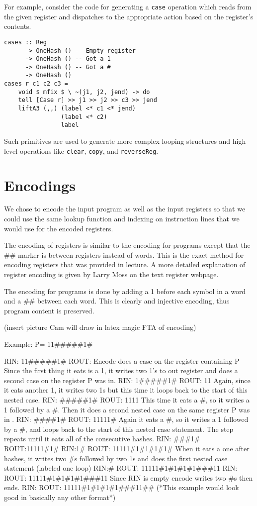 \documentclass[10pt, preprint, nocopyrightspace]{sigplanconf}
\begin{document}
For example, consider the code for generating a \texttt{case} operation which
reads from the given register and dispatches to the appropriate action based
on the register's contents.
\begin{lstlisting}
cases :: Reg
      -> OneHash () -- Empty register
      -> OneHash () -- Got a 1
      -> OneHash () -- Got a #
      -> OneHash ()
cases r c1 c2 c3 =
    void $ mfix $ \ ~(j1, j2, jend) -> do
    tell [Case r] >> j1 >> j2 >> c3 >> jend
    liftA3 (,,) (label <* c1 <* jend)
                (label <* c2)
                label
\end{lstlisting}
Such primitives are used to generate more complex looping structures and high level
operations like \texttt{clear}, \texttt{copy}, and \texttt{reverseReg}.

\section{Encodings}

We chose to encode the input program as well as the input registers so that we could use the same lookup function and indexing on instruction lines that we would use for the encoded registers. 

The encoding of registers is similar to the encoding for programs except that the \#\# marker is between registers instead of words. This is the exact method for encoding registers  that was provided in lecture. A more detailed explanation of register encoding is given by Larry Moss on the text register webpage. 

The encoding for programs is done by adding a 1 before each symbol in a word and a \#\# between each word.  This is clearly and injective encoding, thus program content is preserved. 

(insert picture Cam will draw in latex magic FTA of encoding) 

Example: P= 11\#\#\#\#\#1\# 

RIN: 11\#\#\#\#\#1\#
ROUT: 
Encode does a case on the register containing P
Since the first thing it eats is a 1, it writes two 1’s to out register and does a second case on the register  P was in.
RIN:  1\#\#\#\#\#1\#
ROUT: 11
Again,  since it eats another 1, it writes two 1s but this time it loops back to the start of this nested case. 
RIN: \#\#\#\#\#1\#
ROUT: 1111
This time it eats a \#, so it writes a 1 followed by a \#. Then it does a second nested case on the same register P was in . 
RIN: \#\#\#\#1\#
ROUT: 11111\#
Again it eats a \#, so it writes a 1 followed by a \#, and loops back to the start of this nested case statement. The step repeats until it eats all of the consecutive hashes. 
RIN: \#\#\#1\#
ROUT:11111\#1\#
RIN:1\#
ROUT:  11111\#1\#1\#1\#1\#
When it eats a one after hashes, it writes two \#s followed by two 1s and does the first nested case statement (labeled one loop)
RIN:\#
ROUT: 11111\#1\#1\#1\#1\#\#\#11
RIN: 
ROUT: 11111\#1\#1\#1\#1\#\#\#11
Since RIN is empty encode writes two \#s then ends. 
RIN:
ROUT:  11111\#1\#1\#1\#1\#\#\#11\#\#
(*This example would look good in basically any other format*)
\end{document}

